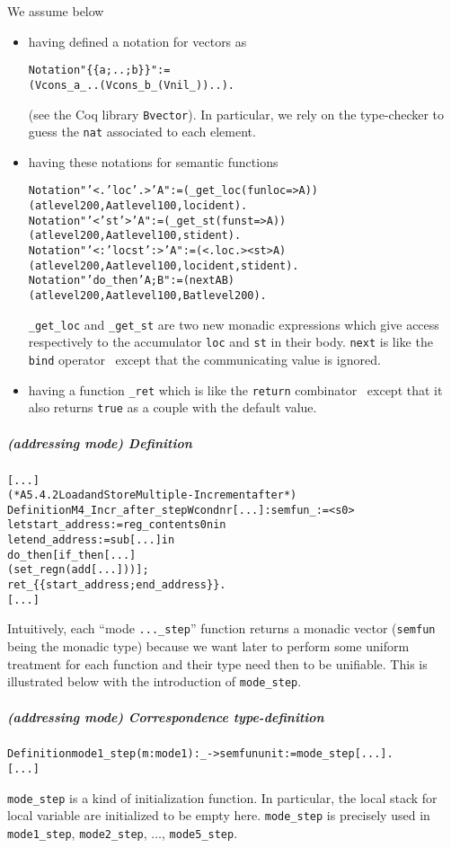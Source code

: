 \documentclass[a4paper, 11pt]{article}
\newenvironment{coq}
  {%
   \begin{alltt}
   \footnotesize} %% 8.3pl2 (April 2011)
  {\end{alltt} %
  }
\begin{document}
We assume below 
\begin{itemize}
\item having defined a notation for vectors as 
\begin{coq}
  Notation "\{\{ a ; .. ; b \}\}" := 
    (Vcons _ a _ .. (Vcons _ b _ (Vnil _)) ..).
\end{coq}
(see the Coq library \verb|Bvector|). In particular, we rely on the type-checker to guess the \verb|nat| associated to each element.
\item having these notations for semantic functions
\begin{coq}
Notation "'<.' loc '.>' A" := (_get_loc (fun loc => A)) 
  (at level 200, A at level 100, loc ident).
Notation "'<' st '>' A" := (_get_st (fun st => A)) 
  (at level 200, A at level 100, st ident).
Notation "'<:' loc st ':>' A" := (<.loc.> <st> A) 
  (at level 200, A at level 100, loc ident, st ident).
Notation "'do_then' A ; B" := (next A B)
  (at level 200 , A at level 100 , B at level 200).
\end{coq}
\verb|_get_loc| and \verb|_get_st| are two new monadic expressions which give access respectively to the accumulator \verb|loc| and \verb|st| in their body.
\verb|next| is like the \verb|bind| operator~\cite{peyton-jones-tackling-09} except that the communicating value is ignored.
\item having a function \verb|_ret| which is like the \verb|return| combinator~\cite{peyton-jones-tackling-09} except that it also returns \verb|true| as a couple with the default value.
\end{itemize}
  \subparagraph{(addressing mode) Definition}
\begin{coq}
[...]
(* A5.4.2 Load and Store Multiple - Increment after *)
Definition M4_Incr_after_step W cond n r [...] : semfun _ := <s0>
  let start_address := reg_content s0 n in
  let end_address := sub [...] in
  do_then [ if_then [...]
       (set_reg n (add [...])) ];
  ret_ \{\{ start_address ; end_address \}\}.
[...]
\end{coq}
Intuitively, each ``mode \verb|..._step|'' function returns a monadic vector (\verb|semfun| being the monadic type) because we want later to perform some uniform treatment for each function and their type need then to be unifiable. This is illustrated below with the introduction of \verb|mode_step|.
\subparagraph{(addressing mode) Correspondence type-definition}
\begin{coq}
Definition mode1\_step (m : mode1) : _ -> semfun unit := mode\_step [...].
[...]
\end{coq}
\verb|mode_step| is a kind of initialization function. In particular, the local stack for local variable are initialized to be empty here. \verb|mode_step| is precisely used in \verb|mode1_step|, \verb|mode2_step|, $\dots$, \verb|mode5_step|.
\end{document}
